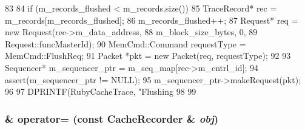 \begin{DoxyCode}
83 {
84     if (m_records_flushed < m_records.size()) {
85         TraceRecord* rec = m_records[m_records_flushed];
86         m_records_flushed++;
87         Request* req = new Request(rec->m_data_address,
88                                    m_block_size_bytes, 0,
89                                    Request::funcMasterId);
90         MemCmd::Command requestType = MemCmd::FlushReq;
91         Packet *pkt = new Packet(req, requestType);
92 
93         Sequencer* m_sequencer_ptr = m_seq_map[rec->m_cntrl_id];
94         assert(m_sequencer_ptr != NULL);
95         m_sequencer_ptr->makeRequest(pkt);
96 
97         DPRINTF(RubyCacheTrace, "Flushing %
98     }
99 }
\end{DoxyCode}
\hypertarget{classCacheRecorder_a91200370312dc9051e23bd44afafd41f}{
\subsubsection[{operator=}]{\& operator= (const {\bf CacheRecorder} \& {\em obj})}}
\label{classCacheRecorder_a91200370312dc9051e23bd44afafd41f}


